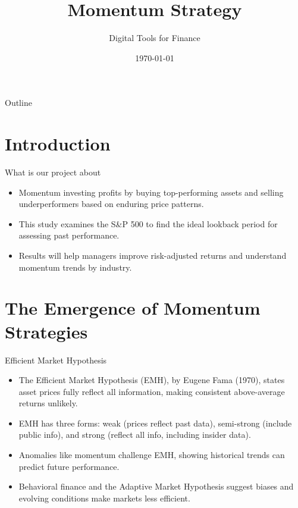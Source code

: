 \documentclass{beamer}
\title{Momentum Strategy}
\author{Digital Tools for Finance}
\date{\today}
\begin{document}
\begin{frame}
    \titlepage
\end{frame}

\begin{frame}{Outline}
    \tableofcontents
\end{frame}

\section{Introduction}
\begin{frame}{What is our project about}
    
    \begin{itemize}
        \item Momentum investing profits by buying top-performing assets and selling underperformers based on enduring price patterns. 
        \item This study examines the S\&P 500 to find the ideal lookback period for assessing past performance.
        \item Results will help managers improve risk-adjusted returns and understand momentum trends by industry.
    \end{itemize}
\end{frame}

\section{The Emergence of Momentum Strategies}


\begin{frame}{Efficient Market Hypothesis}

    \begin{itemize}
        \item The Efficient Market Hypothesis (EMH), by Eugene Fama (1970), states asset prices fully reflect all information, making consistent above-average returns unlikely.
        \item EMH has three forms: weak (prices reflect past data), semi-strong (include public info), and strong (reflect all info, including insider data).
        \item Anomalies like momentum challenge EMH, showing historical trends can predict future performance.
        \item Behavioral finance and the Adaptive Market Hypothesis suggest biases and evolving conditions make markets less efficient.
    \end{itemize}
\end{frame}
\end{document}
